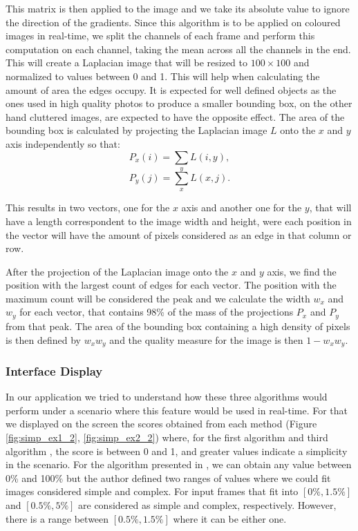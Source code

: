 This matrix is then applied to the image and we take its absolute value to ignore the direction of the gradients. Since this algorithm is to be applied on coloured images in real-time, we split the channels of each frame and perform this computation on each channel, taking the mean across all the channels in the end. This will create a Laplacian image that will be resized to $100\times100$ and normalized to values between 0 and 1. This will help when calculating the amount of area the edges occupy. It is expected for well defined objects as the ones used in high quality photos to produce a smaller bounding box, on the other hand cluttered images, are expected to have the opposite effect.
The area of the bounding box is calculated by projecting the Laplacian image $L$ onto the $x$ and $y$ axis independently so that:
\begin{equation}
P_{x}(i) = \sum_{y} L(i,y),
\end{equation}
\begin{equation}
P_{y}(j) = \sum_{x} L(x,j).
\end{equation}

This results in two vectors, one for the $x$ axis and another one for the $y$, that will have a length correspondent to the image width and height, were each position in the vector will have the amount of pixels considered as an edge in that column or row.

After the projection of the Laplacian image onto the $x$ and $y$ axis, we find the position with the largest count of edges for each vector. The position with the maximum count will be considered the peak and we calculate the width $w_{x}$ and $w_{y}$ for each vector, that contains 98\% of the mass of the projections $P_{x}$ and $P_{y}$ from that peak. The area of the bounding box containing a high density of pixels is then defined by $w_{x}w_{y}$ and the quality measure for the image is then $1-w_{x}w_{y}$.

\subsubsection{Interface Display}

In our application we tried to understand how these three algorithms would perform under a scenario where this feature would be used in real-time. For that we displayed on the screen the scores obtained from each method (Figure \ref{fig:simp_ex1_2}, \ref{fig:simp_ex2_2}) where, for the first algorithm \cite{kaoautomatic} and third algorithm \cite{ke2006design}, the score is between 0 and 1, and greater values indicate a simplicity in the scenario. 
For the algorithm presented in \cite{luo2008photo}, we can obtain any value between 0\% and 100\% but the author defined two ranges of values where we could fit images considered simple and complex. For input frames that fit into $[0\%,1.5\%]$ and $[0.5\%,5\%]$ are considered as simple and complex, respectively. However, there is a range between $[0.5\%,1.5\%]$ where it can be either one.
 
